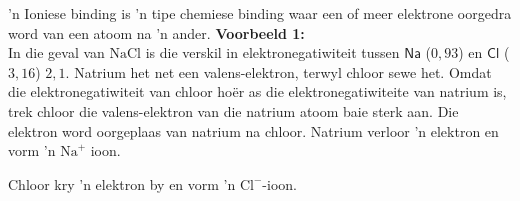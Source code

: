 \label{m38684*fhsst!!!underscore!!!id456}
 { 'n Ioniese binding is 'n tipe chemiese binding waar een of meer elektrone oorgedra word van een atoom na  'n ander.} 
        \label{m38684*id142248}
          \textbf{Voorbeeld 1:}\\
In die geval van $\text{NaCl}$ is die verskil in elektronegatiwiteit tussen $\textsf{Na}$ ($0,93$) en $\textsf{Cl}$ ($3,16$)  $2,1$. Natrium het net een valens-elektron, terwyl chloor sewe het. Omdat die elektronegatiwiteit
van chloor hoër as die elektronegatiwiteite van natrium is,  trek chloor die valens-elektron
van die natrium atoom baie sterk aan. Die elektron word oorgeplaas van natrium na chloor. Natrium
verloor 'n elektron en vorm 'n ${\text{Na}}^{+}$ ioon.\\
  \par
Chloor kry  'n elektron by en vorm 'n ${\text{Cl}}^{-}$-ioon. \\
  \par

